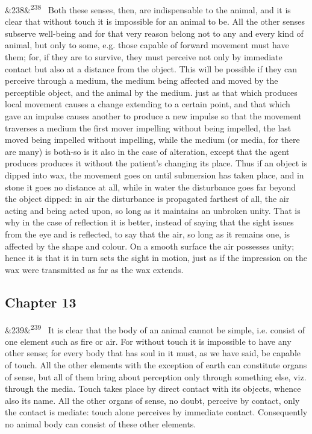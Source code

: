 \documentclass[12pt]{article}
\newcommand{\para}[1][]{\par\noindent\ifx&#1&\else\textsuperscript{\footnotesize #1}~\fi}
\begin{document}
\para[238] Both these senses, then, are indispensable to the animal, and it is clear that without touch it is impossible for an animal to be. All the other senses subserve well-being and for that very reason belong not to any and every kind of animal, but only to some, e.g. those capable of forward movement must have them; for, if they are to survive, they must perceive not only by immediate contact but also at a distance from the object. This will be possible if they can perceive through a medium, the medium being affected and moved by the perceptible object, and the animal by the medium. just as that which produces local movement causes a change extending to a certain point, and that which gave an impulse causes another to produce a new impulse so that the movement traverses a medium the first mover impelling without being impelled, the last moved being impelled without impelling, while the medium (or media, for there are many) is both-so is it also in the case of alteration, except that the agent produces produces it without the patient's changing its place. Thus if an object is dipped into wax, the movement goes on until submersion has taken place, and in stone it goes no distance at all, while in water the disturbance goes far beyond the object dipped: in air the disturbance is propagated farthest of all, the air acting and being acted upon, so long as it maintains an unbroken unity. That is why in the case of reflection it is better, instead of saying that the sight issues from the eye and is reflected, to say that the air, so long as it remains one, is affected by the shape and colour. On a smooth surface the air possesses unity; hence it is that it in turn sets the sight in motion, just as if the impression on the wax were transmitted as far as the wax extends.

\subsection*{Chapter 13}

\para[239] It is clear that the body of an animal cannot be simple, i.e. consist of one element such as fire or air. For without touch it is impossible to have any other sense; for every body that has soul in it must, as we have said, be capable of touch. All the other elements with the exception of earth can constitute organs of sense, but all of them bring about perception only through something else, viz. through the media. Touch takes place by direct contact with its objects, whence also its name. All the other organs of sense, no doubt, perceive by contact, only the contact is mediate: touch alone perceives by immediate contact. Consequently no animal body can consist of these other elements.
\end{document}
